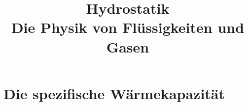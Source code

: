 \documentclass[12pt,a4paper,twoside]{article}
\date{}
\title{Hydrostatik\\{\large Die Physik von Flüssigkeiten und Gasen}}
\def\dir{../Aufgaben_Waerme/}
\newcommand{\Einbinden}[1]{}
\begin{document}



\section*{Die spezifische Wärmekapazität}


\Einbinden{\dir/LT_sWK.tex}
\Einbinden{\dir/tee.tex}
\Einbinden{\dir/hub-waerme.tex}
\Einbinden{\dir/weisswein.tex}
\Einbinden{\dir/nudeln.tex}

\Einbinden{spezWKTabelle.tex}
\end{document}
